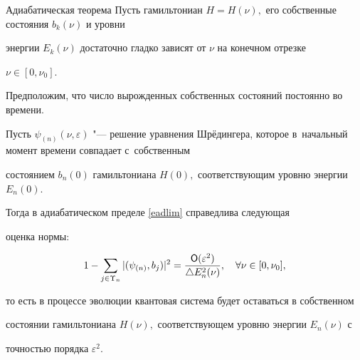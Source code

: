 \begin{newthm}{Адиабатическая теорема} Пусть гамильтониан $H=H(\nu),$ его собственные состояния $b_k(\nu)$ и уровни

энергии $E_k(\nu)$ достаточно гладко зависят от $\nu$ на конечном отрезке

$\nu\in[0,\nu_0].$ 

Предположим, что число вырожденных собственных состояний постоянно во времени{\rm.} 

Пусть $\psi_{(n)}(\nu,\varepsilon )$ "--- решение уравнения Шрёдингера{\rm,} которое в~начальный момент времени совпадает с~собственным

состоянием $b_n(0)$ гамильтониана $H(0),$ соответствующим уровню энергии $E_n(0).$ 

Тогда в адиабатическом пределе \eqref{eadlim} справедлива следующая

оценка нормы\/{\rm:}

\begin{equation}                                                  \label{eotsen}

   1-\sum_{j\in\Upsilon_n}|(\psi_{(n)},b_j)|^2

   =\frac{{\sf O}(\varepsilon^2)}{\triangle E^2_n(\nu)},\quad \forall\nu\in[0,\nu_0],

\end{equation}

то есть в процессе эволюции квантовая система будет оставаться в собственном

состоянии гамильтониана $H(\nu),$ соответствующем уровню энергии $E_n(\nu)$ с

точностью порядка $\varepsilon^2.$

\end{newthm}





